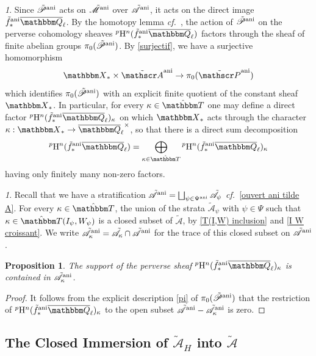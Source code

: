\documentclass[12pt,english]{smfart}
\numberwithin{equation}{subsection}
\newtheorem{proposition}[equation]{Proposition}
\theoremstyle{remark}
\newtheorem{numero}[equation]{}
\newcommand\calA{{\mathscr A}}
\newcommand\calP{{\mathscr P}}
\newcommand\calM{{\mathscr M}}
\newcommand\QQ{{\mathbbm Q}}
\newcommand\bbT{{\mathbbm T}}
\newcommand\rmH{{\rm H}}
\newcommand\bbX{{\mathbbm X}}
\newcommand\cf{{\it cf.\ }}
\newcommand\ani{{\rm ani}}
\newcommand\Ql{{\overline\QQ_\ell}}
\begin{document}
\begin{numero}\label{decomposition tilde f^ani}
Since $\tilde\calP^\ani$ acts on $\tilde\calM^\ani$ over $\tilde\calA^\ani$, it acts on the direct image $\tilde f^\ani_*\Ql$. By the homotopy lemma \cf \cite[3.2.3]{LN}, the action of $\tilde\calP^\ani$ on the perverse cohomology sheaves ${}^p\rmH^n(\tilde f^\ani_*\Ql)$ factors through the sheaf of finite abelian groups $\pi_0(\tilde\calP^\ani)$. By \ref{surjectif}, we have a surjective homomorphism
$$\bbX_*\times\tilde\calA^\ani\rightarrow\pi_0(\tilde\calP^\ani)$$
which identifies $\pi_0(\tilde\calP^\ani)$ with an explicit finite quotient of the constant sheaf $\bbX_*$. In particular, for every $\kappa\in\hat\bbT$ one may define a direct factor ${}^p\rmH^n(\tilde f^\ani_*\Ql)_\kappa$ on which $\bbX_*$ acts through the character $\kappa:\bbX_*\rightarrow\Ql^\times$, so that there is a direct sum decomposition
$${}^p\rmH^n(\tilde f^\ani_*\Ql)=\bigoplus_{\kappa\in\hat\bbT}{}^p\rmH^n(\tilde f^\ani_*\Ql)_\kappa$$
having only finitely many non-zero factors.
\end{numero}

\begin{numero}\label{tilde A_kappa}
Recall that we have a stratification $\tilde\calA^\ani=\bigsqcup_{\psi\in\Psi^\ani}\tilde\calA_\psi$ \cf \ref{ouvert ani tilde A}. For every $\kappa\in\hat\bbT$, the union of the strata $\tilde\calA_\psi$ with $\psi\in\Psi$ such that $\kappa\in\hat\bbT(I_\psi,W_\psi)$ is a closed subset of $\tilde\calA$, by \ref{T(I,W) inclusion} and \ref{I W croissant}. We write $\tilde\calA_\kappa^\ani=\tilde\calA_\kappa\cap\tilde\calA^\ani$ for the trace of this closed subset on $\tilde\calA^\ani$.
\end{numero}

\begin{proposition}\label{contenu dans tilde A kappa}
The support of the perverse sheaf ${}^p\rmH^n(\tilde f^\ani_*\Ql)_\kappa$ is contained in $\tilde\calA_\kappa^\ani$.
\end{proposition}

\begin{proof}
It follows from the explicit description \ref{pi} of $\pi_0(\tilde\calP^\ani)$ that the restriction of ${}^p\rmH^n(\tilde f^\ani_*\Ql)_\kappa$ to the open subset $\tilde\calA^\ani-\tilde\calA_\kappa^\ani$ is zero.
\end{proof}

\subsection{The Closed Immersion of $\tilde\calA_H$ into $\tilde\calA$}
\label{subsection : immersion fermee}
\end{document}
